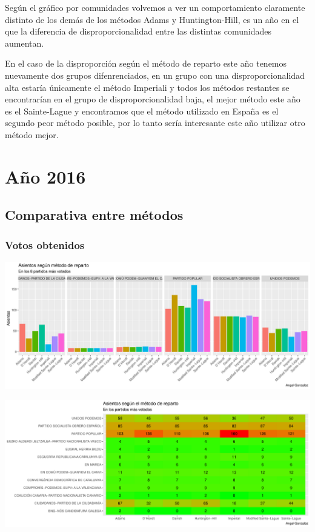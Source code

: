 \documentclass[12pt,a4paper,]{book}
\numberwithin{dummy}{section}
\theoremstyle{ocrenumbox}
\theoremstyle{blacknumex}
\theoremstyle{blacknumbox}
\theoremstyle{ocrenum}
\theoremstyle{ocrenum}
\begin{document}
Según el gráfico por comunidades volvemos a ver un comportamiento
claramente distinto de los demás de los métodos Adams y Huntington-Hill,
es un año en el que la diferencia de disproporcionalidad entre las
distintas comunidades aumentan.

En el caso de la disproporción según el método de reparto este año
tenemos nuevamente dos grupos difenrenciados, en un grupo con una
disproporcionalidad alta estaría únicamente el método Imperiali y todos
los métodos restantes se encontrarían en el grupo de disproporcionalidad
baja, el mejor método este año es el Sainte-Lague y encontramos que el
método utilizado en España es el segundo peor método posible, por lo
tanto sería interesante este año utilizar otro método mejor.

\hypertarget{auxf1o-2016}{%
\section{Año 2016}\label{auxf1o-2016}}

\hypertarget{comparativa-entre-muxe9todos-12}{%
\subsection{Comparativa entre
métodos}\label{comparativa-entre-muxe9todos-12}}

\hypertarget{votos-obtenidos-12}{%
\subsubsection{Votos obtenidos}\label{votos-obtenidos-12}}

\begin{center}\includegraphics[width=0.95\linewidth]{figurasR/unnamed-chunk-167-1} \end{center}

\begin{center}\includegraphics[width=0.95\linewidth]{figurasR/unnamed-chunk-167-2} \end{center}
\end{document}
